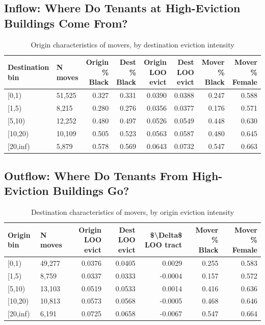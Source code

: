 \documentclass[
  11pt,
]{article}
\begin{document}
\subsection{Inflow: Where Do Tenants at High-Eviction Buildings Come
From?}\label{inflow-where-do-tenants-at-high-eviction-buildings-come-from}

\begingroup\fontsize{9}{11}\selectfont

\begin{longtable}[t]{llrrrrrr}
\caption{\label{tab:inflow-table}Origin characteristics of movers, by destination eviction intensity}\\
\toprule
Destination bin & N moves & Origin \% Black & Dest \% Black & Origin LOO evict & Dest LOO evict & Mover \% Black & Mover \% Female\\
\midrule
{}[0,1) & 51,525 & 0.327 & 0.331 & 0.0390 & 0.0388 & 0.247 & 0.588\\
{}[1,5) & 8,215 & 0.280 & 0.276 & 0.0356 & 0.0377 & 0.176 & 0.571\\
{}[5,10) & 12,252 & 0.480 & 0.497 & 0.0526 & 0.0549 & 0.448 & 0.630\\
{}[10,20) & 10,109 & 0.505 & 0.523 & 0.0563 & 0.0587 & 0.480 & 0.645\\
{}[20,inf) & 5,879 & 0.578 & 0.569 & 0.0643 & 0.0732 & 0.547 & 0.663\\
\bottomrule
\end{longtable}
\endgroup{}

\subsection{Outflow: Where Do Tenants From High-Eviction Buildings
Go?}\label{outflow-where-do-tenants-from-high-eviction-buildings-go}

\begingroup\fontsize{9}{11}\selectfont

\begin{longtable}[t]{llrrrrr}
\caption{\label{tab:outflow-table}Destination characteristics of movers, by origin eviction intensity}\\
\toprule
Origin bin & N moves & Origin LOO evict & Dest LOO evict & \$\textbackslash{}Delta\$ LOO tract & Mover \% Black & Mover \% Female\\
\midrule
{}[0,1) & 49,277 & 0.0376 & 0.0405 & 0.0029 & 0.255 & 0.583\\
{}[1,5) & 8,759 & 0.0337 & 0.0333 & -0.0004 & 0.157 & 0.572\\
{}[5,10) & 13,103 & 0.0519 & 0.0533 & 0.0014 & 0.416 & 0.636\\
{}[10,20) & 10,813 & 0.0573 & 0.0568 & -0.0005 & 0.468 & 0.646\\
{}[20,inf) & 6,191 & 0.0725 & 0.0658 & -0.0067 & 0.547 & 0.664\\
\bottomrule
\end{longtable}
\endgroup{}
\end{document}
